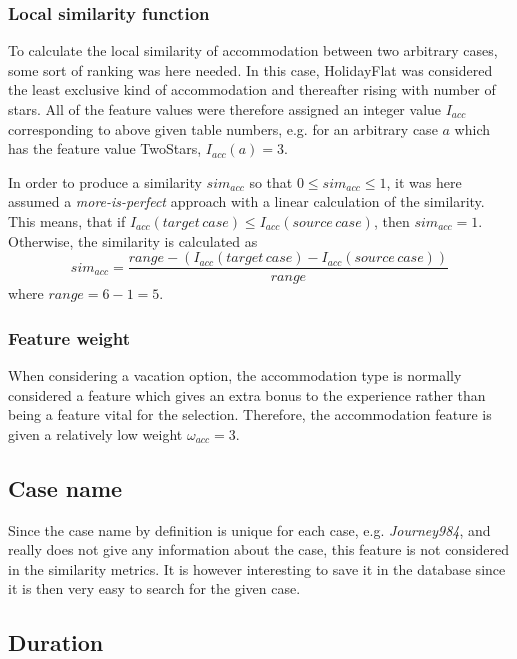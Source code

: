 \documentclass[12pt]{article}
\begin{document}
\subsubsection{Local similarity function}
\label{sec:acc-sim}

To calculate the local similarity of accommodation between two arbitrary cases, some sort of ranking was here needed. 
In this case, HolidayFlat was considered the least exclusive kind of accommodation and thereafter rising with number of stars. All of the feature values were therefore assigned an integer value $I_{acc}$ corresponding to above given table numbers, e.g. for an arbitrary case $a$ which has the feature value TwoStars, $I_{acc}(a)=3$. 

In order to produce a similarity $sim_{acc}$ so that $0 \leq sim_{acc} \leq 1$, it was here assumed a \textit{more-is-perfect} approach with a linear calculation of the similarity. This means, that if $I_{acc}(target\,case) \leq I_{acc}(source\,case)$, then $sim_{acc}=1$. Otherwise, the similarity is calculated as $$sim_{acc}=\frac{range-(I_{acc}(target\,case)-I_{acc}(source\,case))}{range}$$
where $range=6-1=5$. \cite{cbr}

\subsubsection{Feature weight}
\label{sec:acc-weight}

When considering a vacation option, the accommodation type is normally considered a feature which gives an extra bonus to the experience rather than being a feature vital for the selection. Therefore, the accommodation feature is given a relatively low weight  $\omega_{acc}=3$. 

\subsection{Case name}
\label{sec:case-name}

Since the case name by definition is unique for each case, e.g. \textit{Journey984}, and really does not give any information about the case, this feature is not considered in the similarity metrics. It is however interesting to save it in the database since it is then very easy to search for the given case.

\subsection{Duration}
\label{sec:duration}
\end{document}
